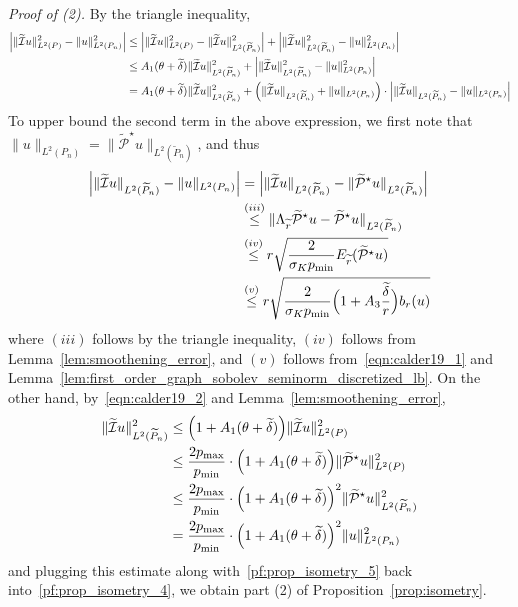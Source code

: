 \documentclass[twoside]{article}
\newcommand{\1}{\mathbf{1}}
\newcommand{\Leb}{L}
\newcommand{\mc}[1]{\mathcal{#1}}
\newcommand{\wt}[1]{\widetilde{#1}}
\theoremstyle{definition}
\theoremstyle{remark}
\begin{document}
\textit{Proof of (2).}
By the triangle inequality,
\begin{align}
\Bigl|\|\wt{\mc{I}}u\|_{\Leb^2(P)}^2 - \|u\|_{\Leb^2(P_n)}^2\Bigr| & \leq \Bigl|\|\wt{\mc{I}}u\|_{\Leb^2(P)}^2 - \|\wt{\mc{I}}u\|_{\Leb^2(\wt{P}_n)}^2\Bigr| + \Bigl|\|\wt{\mc{I}}u\|_{\Leb^2(\wt{P}_n)}^2 - \|u\|_{\Leb^2(P_n)}^2\Bigr| \nonumber \\
& \leq A_1(\theta + \wt{\delta}) \|\wt{\mc{I}}u\|_{\Leb^2(\wt{P}_n)}^2 + \Bigl|\|\wt{\mc{I}}u\|_{\Leb^2(\wt{P}_n)}^2 - \|u\|_{\Leb^2(P_n)}^2\Bigr| \nonumber\\
& = A_1(\theta + \wt{\delta}) \|\wt{\mc{I}}u\|_{\Leb^2(\wt{P}_n)}^2 + \Bigl(\|\wt{\mc{I}}u\|_{\Leb^2(\wt{P}_n)} + \|u\|_{\Leb^2(P_n)}\Bigr) \cdot \Bigl|\|\wt{\mc{I}}u\|_{\Leb^2(\wt{P}_n)} - \|u\|_{\Leb^2(P_n)}\Bigr| \label{pf:prop_isometry_4}
\end{align}
To upper bound the second term in the above expression, we first note that~$\|u\|_{\Leb^2(P_n)} = \|\wt{\mc{P}}^{\star}u\|_{\Leb^2(\wt{P}_n)}$, and thus
\begin{align}
\Bigl|\|\wt{\mc{I}}u\|_{\Leb^2(\wt{P}_n)} - \|u\|_{\Leb^2(P_n)} \Bigr| & = \Bigl|\|\wt{\mc{I}}u\|_{\Leb^2(\wt{P}_n)} - \|\wt{\mc{P}}^{\star}u\|_{\Leb^2(\wt{P}_n)}\Bigr| \nonumber \\
& \overset{(iii)}{\leq} \|\Lambda_{\wt{r}}\wt{\mc{P}}^{\star}u - \wt{\mc{P}}^{\star}u\|_{\Leb^2(\wt{P}_n)} \nonumber \\
& \overset{(iv)}{\leq} r \sqrt{\frac{2}{\sigma_K p_{\min}} E_{\wt{r}}(\wt{\mc{P}}^{\star}u)} \nonumber \\
& \overset{(v)}{\leq} r \sqrt{\frac{2}{\sigma_K p_{\min}} \Bigl(1 + A_3\frac{\wt{\delta}}{r}\Bigr) b_r(u)} \label{pf:prop_isometry_5}
\end{align}
where $(iii)$ follows by the triangle inequality, $(iv)$ follows from Lemma~\ref{lem:smoothening_error}, and $(v)$ follows from~\eqref{eqn:calder19_1} and Lemma~\ref{lem:first_order_graph_sobolev_seminorm_discretized_lb}. On the other hand, by~\eqref{eqn:calder19_2} and Lemma~\ref{lem:smoothening_error},
\begin{align*}
\|\wt{\mc{I}}u\|_{\Leb^2(\wt{P}_n)}^2 & \leq \Bigl(1 + A_1(\theta + \wt{\delta})\Bigr) \|\wt{\mc{I}}u\|_{\Leb^2(P)}^2 \\
& \leq \frac{2p_{\max}}{p_{\min}} \cdot \Bigl(1 + A_1(\theta + \wt{\delta})\Bigr) \|\wt{\mc{P}}^{\star}u\|_{\Leb^2(P)}^2 \\
& \leq \frac{2p_{\max}}{p_{\min}} \cdot \Bigl(1 + A_1(\theta + \wt{\delta})\Bigr)^2 \|\wt{\mc{P}}^{\star}u\|_{\Leb^2(\wt{P}_n)}^2 \\
& = \frac{2p_{\max}}{p_{\min}} \cdot \Bigl(1 + A_1(\theta + \wt{\delta})\Bigr)^2 \|u\|_{\Leb^2(P_n)}^2
\end{align*}
and plugging this estimate along with~\eqref{pf:prop_isometry_5} back into~\eqref{pf:prop_isometry_4}, we obtain part (2) of Proposition~\ref{prop:isometry}.
\end{document}
